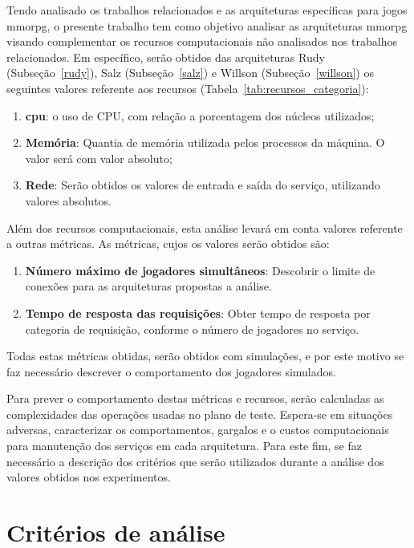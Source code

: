 Tendo analisado os trabalhos relacionados e as arquiteturas específicas para jogos \ac{mmorpg}, o presente trabalho tem como objetivo analisar as arquiteturas \ac{mmorpg} visando complementar os recursos computacionais não analisados nos trabalhos relacionados.
%
Em específico, serão obtidos das arquiteturas Rudy (Subseção~\ref{rudy}), Salz (Subseção~\ref{salz}) e Willson (Subseção~\ref{willson}) os seguintes valores referente aos recursos (Tabela~\ref{tab:recursos_categoria}):

\begin{enumerate}
  \item \textbf{\ac{cpu}}: o uso de CPU, com relação a porcentagem dos núcleos utilizados;
  \item \textbf{Memória}: Quantia de memória utilizada pelos processos da máquina. O valor será com valor absoluto;
  \item \textbf{Rede}: Serão obtidos os valores de entrada e saída do serviço, utilizando valores absolutos.
\end{enumerate}

Além dos recursos computacionais, esta análise levará em conta valores referente a outras métricas.
%
As métricas, cujos os valores serão obtidos são:

\begin{enumerate}
  \item \textbf{Número máximo de jogadores simultâneos}: Descobrir o limite de conexões para as arquiteturas propostas a análise.
  \item \textbf{Tempo de resposta das requisições}: Obter tempo de resposta por categoria de requisição, conforme o número de jogadores no serviço.
\end{enumerate}

Todas estas métricas obtidas, serão obtidos com simulações, e por este motivo se faz necessário descrever o comportamento dos jogadores simulados.

Para prever o comportamento destas métricas e recursos, serão calculadas as complexidades das operações usadas no plano de teste.
%
Espera-se em situações adversas, caracterizar os comportamentos, gargalos e o custos computacionais para manutenção dos serviços em cada arquitetura.
%
Para este fim, se faz necessário a descrição dos critérios que serão utilizados durante a análise dos valores obtidos nos experimentos.


\section{Critérios de análise}
\label{sec:criterios}

